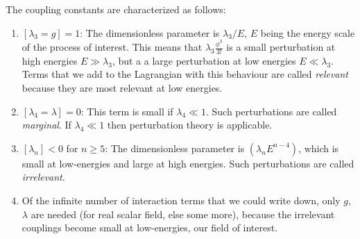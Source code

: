 The coupling constants are characterized as follows:
\begin{enumerate}
	\item $[\lambda_3=g]=1$: The dimensionless parameter is $\lambda_3/E$, $E$ being the energy scale of the process of interest. This means that $\lambda_3 \frac{\phi^3}{3!}$ is a small perturbation at high energies $E\gg \lambda_3$, but a a large perturbation at low energies $E\ll \lambda_3$. Terms that we add to the Lagrangian with this behaviour are called \emph{relevant} because they are most relevant at low energies.
	\item $[\lambda_4=\lambda]=0$: This term is small if $\lambda_4 \ll 1$. Such perturbations are called \emph{marginal}. If $\lambda_4 \ll1$ then perturbation theory is applicable.
	\item $[\lambda_n]<0$ for $n\geq 5$: The dimensionless parameter is $(\lambda_n E^{n-4})$, which is small at low-energies and large at high energies. Such perturbations are called \emph{irrelevant}.
	\item Of the infinite number of interaction terms that we could write down, only $g$,$\lambda$ are needed (for real scalar field, else some more), because the irrelevant couplings become small at low-energies, our field of interest.
\end{enumerate}



